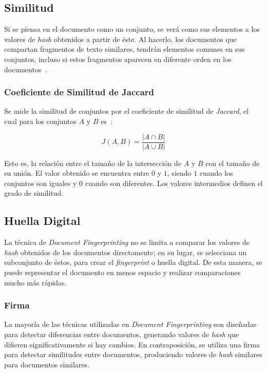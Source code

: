 \subsection{Similitud}

Si se piensa en el documento como un conjunto, se verá como sus elementos a los valores de \textit{hash} obtenidos a partir de éste.
Al hacerlo, los documentos que compartan fragmentos de texto similares, tendrán elementos comunes en sus conjuntos,
incluso si estos fragmentos aparecen en diferente orden en los documentos~\cite{Rajaraman:2011:MMD:2124405}.

\subsubsection{Coeficiente de Similitud de Jaccard}

Se mide la similitud de conjuntos por el coeficiente de similitud de \textit{Jaccard},
el cual para los conjuntos $A$ y $B$ es~\cite{Rajaraman:2011:MMD:2124405}:

\begin{equation*}
J(A, B) = \frac{|A \cap B|}{|A \cup B|}
\end{equation*}

Esto es, la relación entre el tamaño de la intersección de $A$ y $B$ con el tamaño de su unión.
El valor obtenido se encuentra entre $0$ y $1$, 
siendo $1$ cuando los conjuntos son iguales y 
$0$ cuando son diferentes. 
Los valores intermedios definen el grado de similitud.

\subsection{Huella Digital}

La técnica de \textit{Document Fingerprinting} no se limita a 
comparar los valores de \textit{hash} obtenidos de los documentos directamente; 
en su lugar, se selecciona un subconjunto de éstos,
para crear el \textit{fingerprint} o huella digital.
De esta manera, se puede representar el documento en menos espacio
y realizar comparaciones mucho más rápidas.

\subsubsection{Firma}

La mayoría de las técnicas utilizadas en \textit{Document Fingerprinting} 
son diseñadas para detectar diferencias entre documentos,
generando valores de \textit{hash} que difieren significativamente si hay cambios.
En contraposición, se utiliza una firma para detectar similitudes entre documentos,
produciendo valores de \textit{hash} similares para documentos similares.

